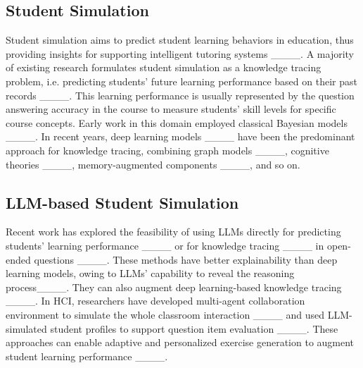 \subsection{Student Simulation}

Student simulation aims to predict student learning behaviors in education, thus providing insights for supporting intelligent tutoring systems ____. A majority of existing research formulates student simulation as a knowledge tracing problem, i.e. predicting students' future learning performance based on their past records  ____. This learning performance is usually represented by the question answering accuracy in the course to measure students' skill levels for specific course concepts. Early work in this domain employed classical Bayesian models ____. In recent years, deep learning models ____ have been the predominant approach for knowledge tracing, combining graph models ____, cognitive theories ____, memory-augmented components ____, and so on.

\subsection{LLM-based Student Simulation}

Recent work has explored the feasibility of using LLMs directly for predicting students' learning performance ____ or for knowledge tracing ____ in open-ended questions ____. 
%
These methods have better explainability than deep learning models, owing to LLMs' capability to reveal the reasoning process____.
%
They can also augment deep learning-based knowledge tracing ____.
%
In HCI, researchers have developed multi-agent collaboration environment to simulate the whole classroom interaction ____ and used LLM-simulated student profiles to support question item evaluation ____. These approaches can enable adaptive and personalized exercise generation to augment student learning performance ____.





